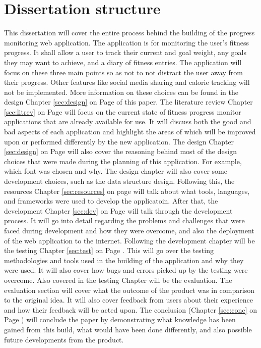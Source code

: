 \section{Dissertation structure}
This dissertation will cover the entire process behind the building of the progress monitoring web application. The application is for monitoring the user's fitness progress. It shall allow a user to track their current and goal weight, any goals they may want to achieve, and a diary of fitness entries. The application will focus on these three main points so as not to not distract the user away from their progress. Other features like social media sharing and calorie tracking will not be implemented. More information on these choices can be found in the design Chapter \ref{sec:design} on Page \pageref{sec:design} of this paper. The literature review Chapter \ref{sec:litrev} on Page \pageref{sec:litrev} will focus on the current state of fitness progress monitor applications that are already available for use. It will discuss both the good and bad aspects of each application and highlight the areas of which will be improved upon or performed differently by the new application. The design Chapter \ref{sec:design} on Page \pageref{sec:design} will also cover the reasoning behind most of the design choices that were made during the planning of this application. For example, which font was chosen and why. The design chapter will also cover some development choices, such as the data structure design. Following this, the resources Chapter \ref{sec:resources} on page \pageref{sec:resources} will talk about what tools, languages, and frameworks were used to develop the applicatoin. After that, the development Chapter \ref{sec:dev} on Page \pageref{sec:dev} will talk through the development process. It will go into detail regarding the problems and challenges that were faced during development and how they were overcome, and also the deployment of the web application to the internet. Following the development chapter will be the testing Chapter \ref{sec:test} on Page \pageref{sec:test}. This will go over the testing methodologies and tools used in the building of the application and why they were used. It will also cover how bugs and errors picked up by the testing were overcome. Also covered in the testing Chapter will be the evaluation. The evaluation section will cover what the outcome of the product was in comparison to the original idea. It will also cover feedback from users about their experience and how their feedback will be acted upon. The conclusion (Chapter \ref{sec:conc} on Page \pageref{sec:conc}) will conclude the paper by demonstrating what knowledge has been gained from this build, what would have been done differently, and also possible future developments from the product.\\

